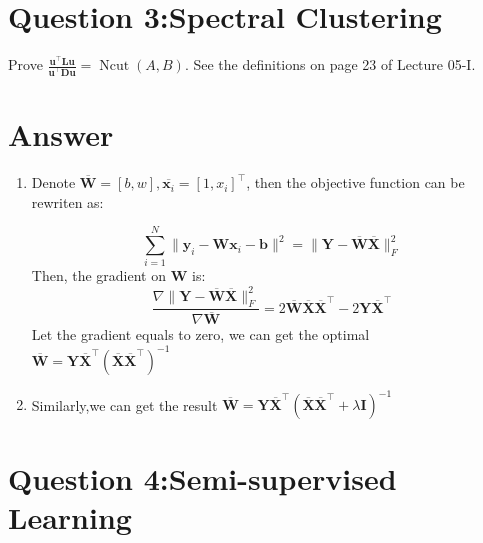\documentclass[
	12pt, %
]{fphw}
\begin{document}
\section*{Question 3:Spectral Clustering}

\begin{problem}
	Prove $\frac{\mathbf{u}^{\top} \mathbf{L u}}{\mathbf{u}^{\top} \mathbf{D u}}=\operatorname{Ncut}(A, B)$. See the definitions on page 23 of Lecture 05-I.
\end{problem}
\section*{Answer}
\begin{enumerate}
	\item Denote $\overline{\mathbf{W}} = [b , w], \overline{\mathbf{x} _i} = [1 , x_i ]^\top$, then the objective function can be rewriten as:

\begin{equation*}
    \sum _{i= 1}^N\|\mathbf{y} _i- \mathbf{W} \mathbf{x} _i- \mathbf{b} \|^2 = \|\mathbf{Y} - \overline{\mathbf{W}}  \overline{\mathbf{X}} \|^2_F
\end{equation*}
Then, the gradient on $\mathbf{W}$ is:
\begin{equation*}
    \frac{\nabla\|\mathbf{Y} - \overline{\mathbf{W}}  \overline{\mathbf{X}} \|^2_F}{\nabla\overline{\mathbf{W}}}=2\overline{\mathbf{W}}\overline{\mathbf{X}} \overline{\mathbf{X}}^{\top}  - 2\mathbf{Y}\overline{\mathbf{X}}^{\top}
\end{equation*}
Let the gradient equals to zero, we can get the optimal $\overline{\mathbf{W}} = \mathbf{Y}\overline{\mathbf{X}}^{\top}\left(\overline{\mathbf{X}}\overline{\mathbf{X}}^{\top} \right)^{-1} $

\item Similarly,we can get the result $\overline{\mathbf{W}} = \mathbf{Y}\overline{\mathbf{X}}^{\top}\left(\overline{\mathbf{X}}\overline{\mathbf{X}}^{\top} +\lambda\mathbf{I} \right)^{-1}$
\end{enumerate}

\section*{Question 4:Semi-supervised Learning }
\end{document}

